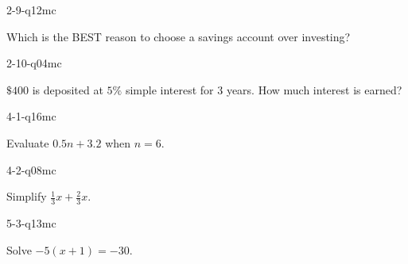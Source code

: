 \begin{practiceQuestion}{2-9-q12}{mc}
\begin{questionText}
Which is the BEST reason to choose a savings account over investing?
\end{questionText}
\end{practiceQuestion}

\begin{practiceQuestion}{2-10-q04}{mc}
\begin{questionText}
$\$400$ is deposited at $5\%$ simple interest for $3$ years. How much interest is earned?
\end{questionText}
\end{practiceQuestion}

\begin{practiceQuestion}{4-1-q16}{mc}
\begin{questionText}
Evaluate $0.5n + 3.2$ when $n = 6$.
\end{questionText}
\end{practiceQuestion}

\begin{practiceQuestion}{4-2-q08}{mc}
\begin{questionText}
Simplify $\frac{1}{3}x + \frac{2}{3}x$.


\begin{center}
\hspace{1cm}
\end{center}
\end{questionText}
\end{practiceQuestion}

\begin{practiceQuestion}{5-3-q13}{mc}
\begin{questionText}
Solve $-5(x + 1) = -30$.
\end{questionText}
\end{practiceQuestion}

